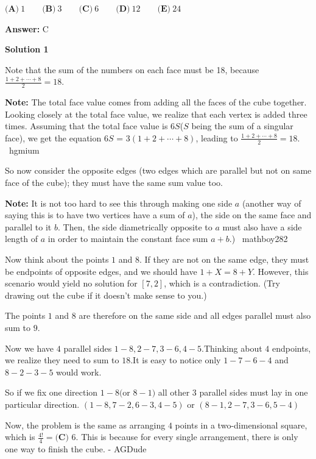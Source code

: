 \begin{enumerate}
 $\textbf{(A)}\ 1\qquad\textbf{(B)}\ 3\qquad\textbf{(C)}\ 6\qquad\textbf{(D)}\ 12\qquad\textbf{(E)}\ 24$

 \textbf{Answer: }C



\textbf{Solution 1}

Note that the sum of the numbers on each face must be 18, because $\frac{1+2+\cdots+8}{2}=18$. 

 \textbf{Note:} The total face value comes from adding all the faces of the cube together. Looking closely at the total face value, we realize that each vertex is added three times. Assuming that the total face value is $6S$($S$ being the sum of a singular face), we get the equation $6S$ = $3(1+2+\cdots+8)$, leading to $\frac{1+2+\cdots+8}{2}=18$. ~hgmium

 So now consider the opposite edges (two edges which are parallel but not on same face of the cube); they must have the same sum value too.

 \textbf{Note:} It is not too hard to see this through making one side $a$ (another way of saying this is to have two vertices have a sum of $a$), the side on the same face and parallel to it $b.$ Then, the side diametrically opposite to $a$ must also have a side length of $a$ in order to maintain the constant face sum $a+b.$) ~mathboy282

 Now think about the points $1$ and $8$. If they are not on the same edge, they must be endpoints of opposite edges, and we should have $1+X=8+Y$. However, this scenario would yield no solution for $[7,2]$, which is a contradiction. (Try drawing out the cube if it doesn't make sense to you.)

 The points $1$ and $8$ are therefore on the same side and all edges parallel must also sum to $9$.

 Now we have $4$ parallel sides $1-8, 2-7, 3-6, 4-5$.Thinking about $4$ endpoints, we realize they need to sum to $18$.It is easy to notice only $1-7-6-4$ and $8-2-3-5$ would work.

 So if we fix one direction $1-8 ($or $8-1)$ all other $3$ parallel sides must lay in one particular direction. $(1-8,7-2,6-3,4-5)$ or $(8-1,2-7,3-6,5-4)$

 Now, the problem is the same as arranging $4$ points in a two-dimensional square, which is $\frac{4!}{4}=\boxed{\textbf{(C) }6.}$ This is because for every single arrangement, there is only one way to finish the cube. - AGDude

 




\end{enumerate}
